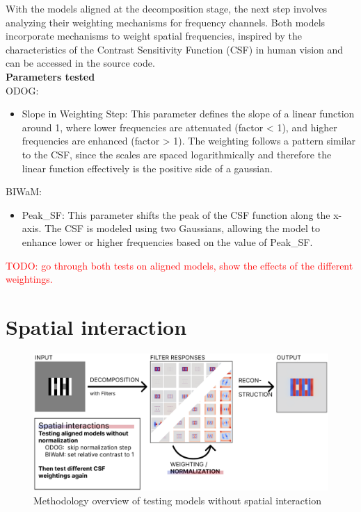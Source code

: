 With the models aligned at the decomposition stage, the next step involves analyzing their
weighting mechanisms for frequency channels. Both models incorporate mechanisms to weight
spatial frequencies, inspired by the characteristics of the Contrast Sensitivity Function
(CSF) in human vision and can be accessed in the source code.\\
\textbf{Parameters tested} \\
ODOG:
\begin{itemize} 
    \item Slope in Weighting Step: This parameter defines the slope of a linear function
    around 1, where lower frequencies are attenuated (factor < 1), and higher frequencies
    are enhanced (factor > 1). The weighting follows a pattern similar to the CSF, since
    the scales are spaced logarithmically and therefore the linear function effectively is
    the positive side of a gaussian.
\end{itemize}
BIWaM:
\begin{itemize} 
    \item Peak\_SF: This parameter shifts the peak of the CSF function along the x-axis.
    The CSF is modeled using two Gaussians, allowing the model to enhance lower or higher
    frequencies based on the value of Peak\_SF.
\end{itemize}

\textcolor{red}{TODO: go through both tests on aligned models, show the effects of the
different weightings.}

\newpage
\section{Spatial interaction}

\begin{figure}[H]
    \centering
    \includegraphics[width=\linewidth]{media/methodology/spatial_interaction_overview.png}
    \begin{minipage}{0.8\textwidth}
    \caption{Methodology overview of testing models without spatial interaction}
    \label{fig:figure14}
    \end{minipage}
\end{figure}

